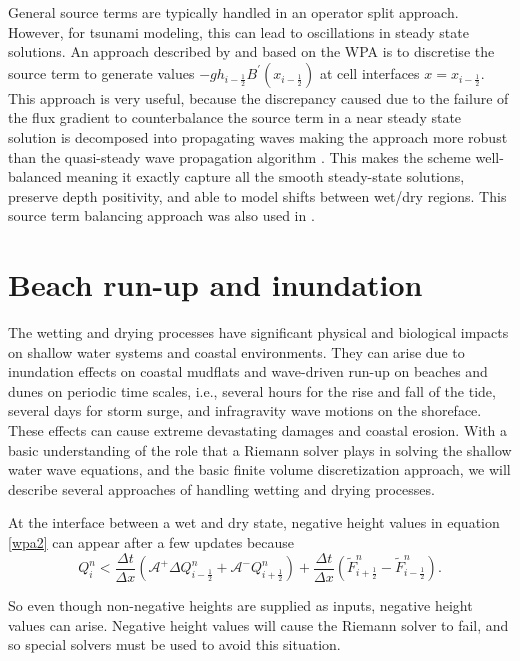 \documentclass[10pt,a4paper]{article}
\begin{document}
	General source terms are typically handled in an operator split approach.  However, for tsunami modeling, this can lead to oscillations in steady state solutions.  An approach described by \cite{ba-le-mi-ro:2003} and based on the WPA is to discretise the source term to generate values $-gh_{i-\frac{1}{2}}B^{\prime}(x_{i-\frac{1}{2}})$ at  cell interfaces  $x = x_{i-\frac{1}{2}}$. This approach is very useful, because the discrepancy caused due to the failure of the flux gradient to counterbalance the source term in a near steady state solution is decomposed into propagating waves  making the approach more robust than the quasi-steady wave propagation algorithm .  This makes the scheme well-balanced  meaning it exactly capture all the smooth steady-state solutions, preserve depth positivity, and able to model shifts between wet/dry regions. This source term balancing approach was also used in \cite{chaabelasri1849simple}. 


\section{Beach run-up and inundation}
The wetting and drying processes have significant physical and biological impacts on shallow water systems and coastal environments. They can arise due to inundation effects on coastal mudflats and wave-driven run-up on beaches and dunes on periodic time scales, i.e., several hours for the rise and fall of the tide, several days for storm surge, and infragravity wave motions on the shoreface.  These effects can cause extreme devastating damages and coastal erosion.
	With a basic understanding of the role that a Riemann solver plays in solving the shallow water wave equations, and the basic finite volume discretization approach, we will describe several approaches of handling wetting and drying processes.  

At the interface between a wet and dry state, negative height values in equation \eqref{wpa2} can appear after a few updates because
\begin{equation}
	Q_{i}^{n} < \frac{\Delta t}{\Delta x}(\mathcal{A^{+}}\Delta 	Q_{i-\frac{1}{2}}^{n} + \mathcal{A^{-}}Q_{i+\frac{1}{2}}^{n}) + \frac{\Delta t}{\Delta x} (\tilde{F}_{i+\frac{1}{2}}^{n} - \tilde{F}_{i-\frac{1}{2}}^{n} ).
	\label{wpa22}
\end{equation}

So even though non-negative heights are supplied as inputs, negative height values can arise.  Negative height values will cause the Riemann solver to fail, and so special solvers must be used to avoid this situation.
\end{document}
